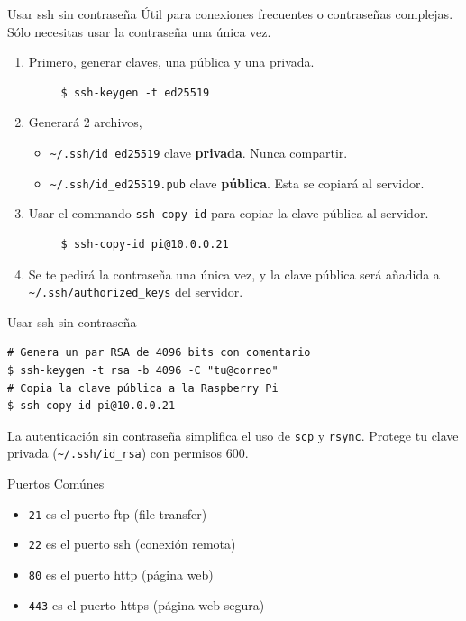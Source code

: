 \documentclass[aspectratio=169,professionalfonts]{beamer}
\begin{document}
\begin{frame}[fragile]{Usar ssh sin contraseña}
  Útil para conexiones frecuentes o contraseñas complejas. Sólo necesitas usar la contraseña una única vez.
  \begin{enumerate}
    \item Primero, generar claves, una pública y una privada.
    \begin{verbatim}
     $ ssh-keygen -t ed25519
    \end{verbatim}
    \item Generará 2 archivos,
    \begin{itemize}
      \item \texttt{\textasciitilde/.ssh/id\_ed25519} clave \textbf{privada}. Nunca compartir.
      \item \texttt{\textasciitilde/.ssh/id\_ed25519.pub} clave \textbf{pública}. Esta se copiará al servidor.
    \end{itemize}
    \item Usar el commando \texttt{ssh-copy-id} para copiar la clave pública al servidor.
    \begin{verbatim}
     $ ssh-copy-id pi@10.0.0.21
    \end{verbatim}
    \item Se te pedirá la contraseña una única vez, y la clave pública será añadida a \texttt{\textasciitilde/.ssh/authorized\_keys} del servidor.
  \end{enumerate}
\end{frame}

\begin{frame}[fragile]{Usar ssh sin contraseña}
  \begin{verbatim}
# Genera un par RSA de 4096 bits con comentario
$ ssh-keygen -t rsa -b 4096 -C "tu@correo"
# Copia la clave pública a la Raspberry Pi
$ ssh-copy-id pi@10.0.0.21
  \end{verbatim}
  \begin{infobox}
  La autenticación sin contraseña simplifica el uso de \texttt{scp} y \texttt{rsync}. Protege tu clave privada (\texttt{\textasciitilde/.ssh/id\_rsa}) con permisos 600.
  \end{infobox}
\end{frame}

\begin{frame}[fragile]{Puertos Comúnes}
  \begin{itemize}
    \item \texttt{21} es el puerto ftp (file transfer)
    \item \texttt{22} es el puerto ssh (conexión remota)
    \item \texttt{80} es el puerto http (página web)
    \item \texttt{443} es el puerto https (página web segura)
  \end{itemize}
\end{frame}
\end{document}
